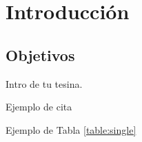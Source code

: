 \chapter{Introducción} \label{cap:intro}

\section{Objetivos} \label{cap:intro:sec:obj}

Intro de tu tesina.

Ejemplo de cita \cite{esp:blast2}



Ejemplo de Tabla \ref{table:single}
